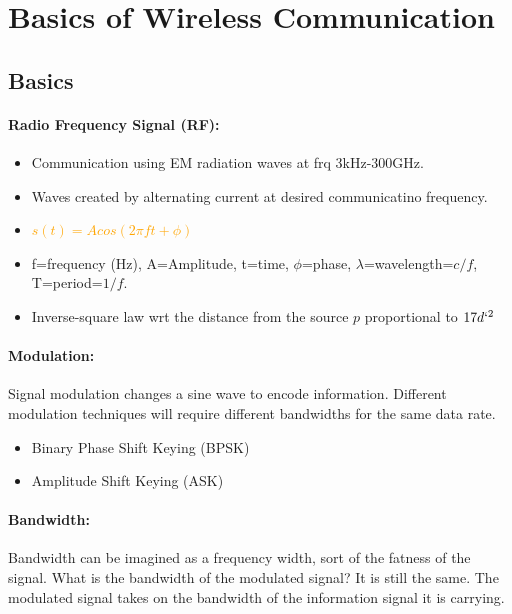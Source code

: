 \section{Basics of Wireless Communication}

\subsection{Basics}

\begin{minipage}{\linewidth}
    \centering      
    \def\svgwidth{\columnwidth}
    
\end{minipage}

\paragraph{Radio Frequency Signal (RF):}
\begin{itemize}
    \item Communication using EM radiation waves at frq 3kHz-300GHz.
    \item Waves created by alternating current at desired communicatino frequency.
    \item \textcolor{orange}{$s(t) = A cos(2\pi ft + \phi)$} 
    \item f=frequency (Hz), A=Amplitude, t=time, $\phi$=phase, $\lambda$=wavelength=$c/f$, T=period=$1/f$.
    \item Inverse-square law wrt the distance from the source $p$ proportional to $17d`^2$
\end{itemize}


\paragraph{Modulation:} Signal modulation changes a sine wave to encode information. Different modulation techniques will require different bandwidths for the same data rate.
\begin{itemize}
    \item Binary Phase Shift Keying (BPSK)
    \item Amplitude Shift Keying (ASK)
\end{itemize}

\paragraph{Bandwidth:}Bandwidth can be imagined as a frequency width, sort of the fatness of the signal. What is the bandwidth of the modulated signal? It is still the same. The modulated signal takes on the bandwidth of the information signal it is carrying.


